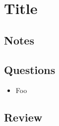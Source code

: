 \chapter{Title \cite{key}}
\section{Notes}

\section{Questions}
\begin{itemize}
  \item Foo
\end{itemize}

\section{Review}
